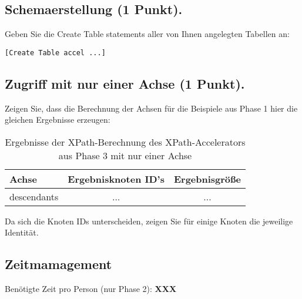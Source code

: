 \documentclass[11pt]{scrartcl}
\begin{document}
\subsection*{Schemaerstellung (1 Punkt).}
Geben Sie die Create Table statements aller von Ihnen angelegten Tabellen an:
\begin{lstlisting}[style=dmrsql]
[Create Table accel ...]
\end{lstlisting}

\subsection*{Zugriff mit nur einer Achse (1 Punkt).}
Zeigen Sie, dass die Berechnung der Achsen für die Beispiele aus Phase 1 hier die gleichen Ergebnisse erzeugen:

\begin{table}[h]
	\centering
		\begin{center}
			\begin{tabular}{ l | c c }
				\toprule
				Achse & Ergebnisknoten ID's & Ergebnisgröße\\
				\midrule
				descendants & ... & ... \\  
				\bottomrule
			\end{tabular}
			\end{center}
	\caption{Ergebnisse der XPath-Berechnung des XPath-Accelerators aus Phase 3 mit nur einer Achse}
	\label{tab:ErgebnisseDerXPathBerechnug}
\end{table}

Da sich die Knoten IDs unterscheiden, zeigen Sie für einige Knoten die jeweilige Identität.

\subsection*{Zeitmamagement}

Benötigte Zeit pro Person (nur Phase 2): \textbf{XXX}
\end{document}

